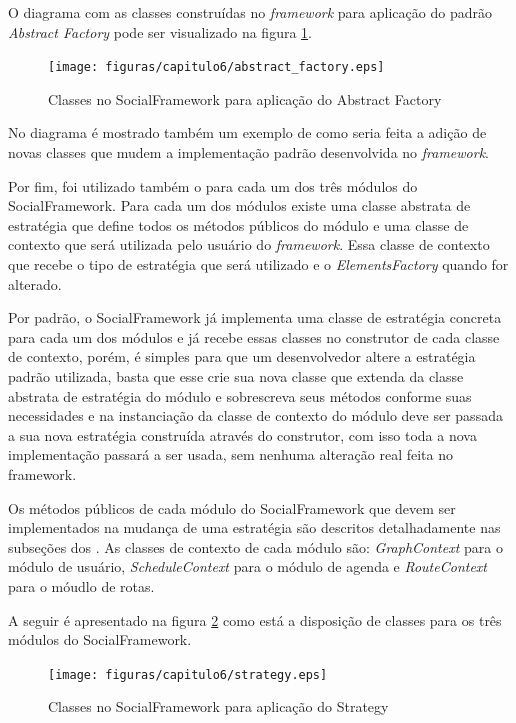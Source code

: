O diagrama com as classes construídas no \textit{framework} para aplicação do padrão \textit{Abstract Factory} pode ser visualizado na figura \ref{padrao_abstract_factory}.

\newpage
\begin{figure}[h]
    \centering
    \texttt{[image: figuras/capitulo6/abstract\_factory.eps]}
    \caption{Classes no SocialFramework para aplicação do Abstract Factory}
    \label{padrao_abstract_factory}
\end{figure}

No diagrama é mostrado também um exemplo de como seria feita a adição de novas classes que mudem a implementação padrão desenvolvida no \textit{framework}.

Por fim, foi utilizado também o  para cada um dos três módulos do SocialFramework. Para cada um dos módulos existe uma classe abstrata de estratégia que define todos os métodos públicos do módulo e uma classe de contexto que será utilizada pelo usuário do \textit{framework}. Essa classe de contexto que recebe o tipo de estratégia que será utilizado e o \textit{ElementsFactory} quando for alterado.

Por padrão, o SocialFramework já implementa uma classe de estratégia concreta para cada um dos módulos e já recebe essas classes no construtor de cada classe de contexto, porém, é simples para que um desenvolvedor altere a estratégia padrão utilizada, basta que esse crie sua nova classe que extenda da classe abstrata de estratégia do módulo e sobrescreva seus métodos conforme suas necessidades e na instanciação da classe de contexto do módulo deve ser passada a sua nova estratégia construída através do construtor, com isso toda a nova implementação passará a ser usada, sem nenhuma alteração real feita no framework.

Os métodos públicos de cada módulo do SocialFramework que devem ser implementados na mudança de uma estratégia são descritos detalhadamente nas subseções dos . As classes de contexto de cada módulo são: \textit{GraphContext} para o módulo de usuário, \textit{ScheduleContext} para o módulo de agenda e \textit{RouteContext} para o móudlo de rotas.

A seguir é apresentado na figura \ref{padrao_strategy} como está a disposição de classes para os três módulos do SocialFramework.

\begin{figure}[h]
    \centering
    \texttt{[image: figuras/capitulo6/strategy.eps]}
    \caption{Classes no SocialFramework para aplicação do Strategy}
    \label{padrao_strategy}
\end{figure}

